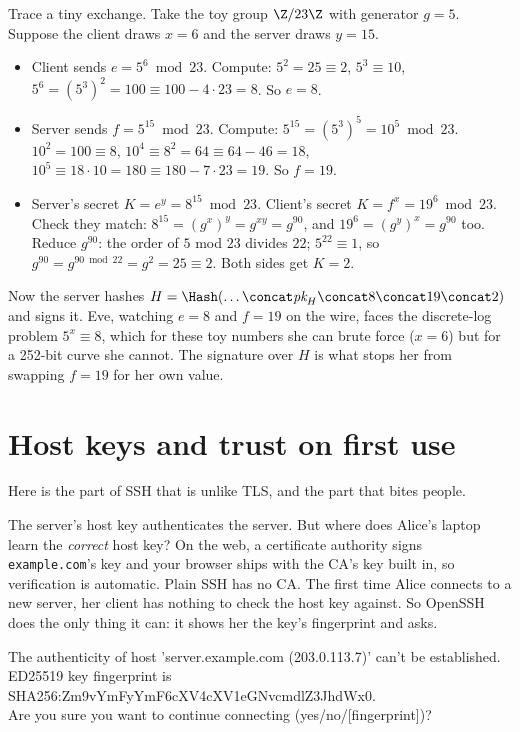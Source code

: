 \begin{walkbox}
Trace a tiny exchange. Take the toy group $\Z/23\Z$ with generator $g = 5$. Suppose the client draws $x = 6$ and the server draws $y = 15$.
\begin{itemize}
  \item Client sends $e = 5^{6} \bmod 23$. Compute: $5^2 = 25 \equiv 2$, $5^3 \equiv 10$, $5^6 = (5^3)^2 = 100 \equiv 100 - 4\cdot23 = 8$. So $e = 8$.
  \item Server sends $f = 5^{15} \bmod 23$. Compute: $5^{15} = (5^3)^5 = 10^5 \bmod 23$. $10^2 = 100 \equiv 8$, $10^4 \equiv 8^2 = 64 \equiv 64-46 = 18$, $10^5 \equiv 18 \cdot 10 = 180 \equiv 180 - 7\cdot23 = 19$. So $f = 19$.
  \item Server's secret $K = e^{y} = 8^{15} \bmod 23$. Client's secret $K = f^{x} = 19^{6} \bmod 23$. Check they match: $8^{15} = (g^{x})^{y} = g^{xy} = g^{90}$, and $19^{6} = (g^{y})^{x} = g^{90}$ too. Reduce $g^{90}$: the order of $5$ mod $23$ divides $22$; $5^{22} \equiv 1$, so $g^{90} = g^{90 \bmod 22} = g^{2} = 25 \equiv 2$. Both sides get $K = 2$.
\end{itemize}
Now the server hashes $H = \Hash(\dots \concat \textit{pk}_H \concat 8 \concat 19 \concat 2)$ and signs it. Eve, watching $e=8$ and $f=19$ on the wire, faces the discrete-log problem $5^{x} \equiv 8$, which for these toy numbers she can brute force ($x=6$) but for a 252-bit curve she cannot. The signature over $H$ is what stops her from swapping $f=19$ for her own value.
\end{walkbox}

\section{Host keys and trust on first use}

Here is the part of SSH that is unlike TLS, and the part that bites people.

The server's host key authenticates the server. But where does Alice's laptop learn the \emph{correct} host key? On the web, a certificate authority signs \texttt{example.com}'s key and your browser ships with the CA's key built in, so verification is automatic. Plain SSH has no CA. The first time Alice connects to a new server, her client has nothing to check the host key against. So OpenSSH does the only thing it can: it shows her the key's fingerprint and asks.

\begin{center}\ttfamily
The authenticity of host 'server.example.com (203.0.113.7)' can't be established.\\
ED25519 key fingerprint is SHA256:Zm9vYmFyYmF6cXV4cXV1eGNvcmdlZ3JhdWx0.\\
Are you sure you want to continue connecting (yes/no/[fingerprint])?
\end{center}

